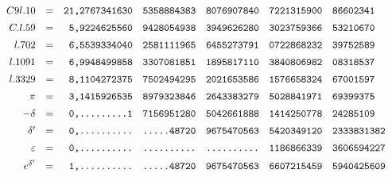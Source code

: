 \begingroup\footnotesize\setlength{\arraycolsep}{1pt}\renewcommand{\arraystretch}{1.12}\[
\begin{array}{rcrlllll}
C9l.10&=&\text{\ttfamily 21,2767341630}&\text{\ttfamily 5358884383}&\text{\ttfamily 8076907840}&\text{\ttfamily 7221315900}&\text{\ttfamily 86602341}&\\[5pt]
C.l.59&=&\text{\ttfamily 5,9224625560}&\text{\ttfamily 9428054938}&\text{\ttfamily 3949626280}&\text{\ttfamily 3023759366}&\text{\ttfamily 53210670}&\\[5pt]
l.702&=&\text{\ttfamily 6,5539334040}&\text{\ttfamily 2581111965}&\text{\ttfamily 6455273791}&\text{\ttfamily 0722868232}&\text{\ttfamily 39752589}&\\[5pt]
l.1091&=&\text{\ttfamily 6,9948499858}&\text{\ttfamily 3307081851}&\text{\ttfamily 1895817110}&\text{\ttfamily 3840806982}&\text{\ttfamily 08318537}&\\[5pt]
l.3329&=&\text{\ttfamily 8,1104272375}&\text{\ttfamily 7502494295}&\text{\ttfamily 2021653586}&\text{\ttfamily 1576658324}&\text{\ttfamily 67001597}&\\[5pt]
\pi&=&\text{\ttfamily 3,1415926535}&\text{\ttfamily 8979323846}&\text{\ttfamily 2643383279}&\text{\ttfamily 5028841971}&\text{\ttfamily 69399375}&\\[5pt]
-\delta&=&\text{\ttfamily 0,.........1}&\text{\ttfamily 7156951280}&\text{\ttfamily 5042661888}&\text{\ttfamily 1414250778}&\text{\ttfamily 24285109}&\\[5pt]
\delta'&=&\text{\ttfamily 0,..........}&\text{\ttfamily .....48720}&\text{\ttfamily 9675470563}&\text{\ttfamily 5420349120}&\text{\ttfamily 2333831382}&\\[5pt]
\varepsilon&=&\text{\ttfamily 0,..........}&\text{\ttfamily ..........}&\text{\ttfamily ..........}&\text{\ttfamily 1186866339}&\text{\ttfamily 3606594227}&\\[5pt]
e^{\delta'}&=&\text{\ttfamily 1,..........}&\text{\ttfamily .....48720}&\text{\ttfamily 9675470563}&\text{\ttfamily 6607215459}&\text{\ttfamily 5940425609}&\\[5pt]

\end{array}\]
